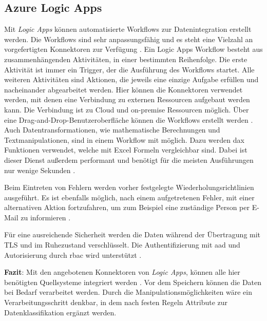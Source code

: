 \subsection{Azure Logic Apps} \label{sec:grundlagen:azure_dienste:logicApps}
Mit \textit{Logic Apps} können automatisierte Workflows zur Datenintegration erstellt werden. Die Workflows sind sehr anpassungsfähig und es steht eine Vielzahl an vorgefertigten Konnektoren zur Verfügung \cite{kumar_serverless_2019}. Ein Logic Apps Workflow besteht aus zusammenhängenden Aktivitäten, in einer bestimmten Reihenfolge. Die erste Aktivität ist immer ein Trigger, der die Ausführung des Workflows startet. Alle weiteren Aktivitäten sind Aktionen, die jeweils eine einzige Aufgabe erfüllen und nacheinander abgearbeitet werden. Hier können die Konnektoren verwendet werden, mit denen eine Verbindung zu externen Ressourcen aufgebaut werden kann. Die Verbindung ist zu Cloud und on-premise Ressourcen möglich. Über eine Drag-and-Drop-Benutzeroberfläche können die Workflows erstellt werden \cite{modi_azure_2020}. Auch Datentransformationen, wie mathematische Berechnungen und Textmanipulationen, sind in einem Workflow mit möglich. Dazu werden \ac{dax} Funktionen verwendet, welche mit Excel Formeln vergleichbar sind. Dabei ist dieser Dienst außerdem performant und benötigt für die meisten Ausführungen nur wenige Sekunden \cite{bennett_enterprise_2021}.

Beim Eintreten von Fehlern werden vorher festgelegte Wiederholungsrichtlinien ausgeführt. Es ist ebenfalls möglich, nach einem aufgetretenen Fehler, mit einer alternativen Aktion fortzufahren, um zum Beispiel eine zuständige Person per E-Mail zu informieren \cite{fan_handle_2021}.

Für eine ausreichende Sicherheit werden die Daten während der Übertragung mit TLS und im Ruhezustand verschlüsselt. Die Authentifizierung mit \ac{aad} und Autorisierung durch \ac{rbac} wird unterstützt \cite{baldwin_azure_logicApps_2021}. 

\textbf{Fazit}: Mit den angebotenen Konnektoren von \textit{Logic Apps}, können alle hier benötigten Quellsysteme integriert werden \cite[vgl.][]{fan_verwaltete_2021}. Vor dem Speichern können die Daten bei Bedarf verarbeitet werden. Durch die Manipulationsmöglichkeiten wäre ein Verarbeitungsschritt denkbar, in dem nach festen Regeln Attribute zur Datenklassifikation ergänzt werden.


